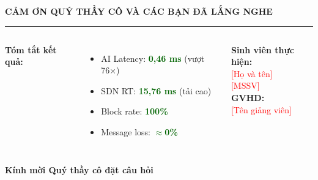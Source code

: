 \documentclass[aspectratio=169, 12pt]{beamer}
\begin{document}
\begin{frame}

\begin{center}
\vspace{0.5cm}
{\Large \textbf{CẢM ƠN QUÝ THẦY CÔ VÀ CÁC BẠN ĐÃ LẮNG NGHE}}

\vspace{1cm}
\rule{0.6\textwidth}{0.5pt}
\vspace{0.5cm}

\begin{columns}[c]
\centering
\textbf{Tóm tắt kết quả:}
\begin{itemize}
  \item AI Latency: \textcolor{darkgreen}{\textbf{0,46 ms}} (vượt 76×)
  \item SDN RT: \textcolor{darkgreen}{\textbf{15,76 ms}} (tải cao)
  \item Block rate: \textcolor{darkgreen}{\textbf{100\%}}
  \item Message loss: \textcolor{darkgreen}{\textbf{$\approx$0\%}}
\end{itemize}

\centering
\textbf{Sinh viên thực hiện:}\\[0.3cm]
\textcolor{red}{[Họ và tên]}\\
\textcolor{red}{[MSSV]}\\[0.3cm]
\textbf{GVHD:}\\
\textcolor{red}{[Tên giảng viên]}
\end{columns}

\vspace{0.8cm}
{\large \textcolor{ptitblue}{\textbf{Kính mời Quý thầy cô đặt câu hỏi}}}
\end{center}

\end{frame}
\end{document}
